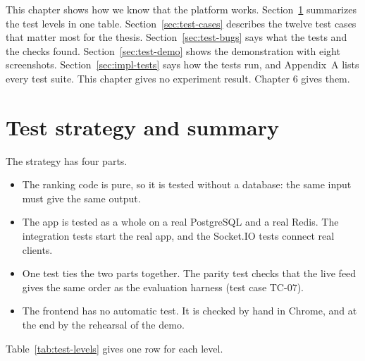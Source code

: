 \setlength{\emergencystretch}{3em}
\renewcommand{\topfraction}{0.9}
\renewcommand{\bottomfraction}{0.7}
\renewcommand{\textfraction}{0.1}
\renewcommand{\floatpagefraction}{0.8}

\label{ch:tests}

This chapter shows how we know that the platform works. Section~\ref{sec:test-strategy} summarizes the test levels in one table. Section~\ref{sec:test-cases} describes the twelve test cases that matter most for the thesis. Section~\ref{sec:test-bugs} says what the tests and the checks found. Section~\ref{sec:test-demo} shows the demonstration with eight screenshots. Section~\ref{sec:impl-tests} says how the tests run, and Appendix~A lists every test suite. This chapter gives no experiment result. Chapter 6 gives them.

\section{Test strategy and summary}
\label{sec:test-strategy}

The strategy has four parts.
\begin{itemize}
  \item The ranking code is pure, so it is tested without a database: the same input must give the same output.
  \item The app is tested as a whole on a real PostgreSQL and a real Redis. The integration tests start the real app, and the Socket.IO tests connect real clients.
  \item One test ties the two parts together. The parity test checks that the live feed gives the same order as the evaluation harness (test case TC-07).
  \item The frontend has no automatic test. It is checked by hand in Chrome, and at the end by the rehearsal of the demo.
\end{itemize}
Table~\ref{tab:test-levels} gives one row for each level.

